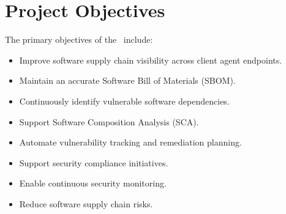 \vspace{0.4cm}


\section{Project Objectives}

The primary objectives of the \ProjectName\ include:
\begin{itemize}
\item Improve software supply chain visibility across client agent endpoints.
\item Maintain an accurate Software Bill of Materials (SBOM).
\item Continuously identify vulnerable software dependencies.
\item Support Software Composition Analysis (SCA).
\item Automate vulnerability tracking and remediation planning.
\item Support security compliance initiatives.
\item Enable continuous security monitoring.
\item Reduce software supply chain risks.
\end{itemize}
